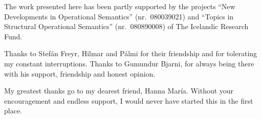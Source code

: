 The work presented here has been partly supported by the projects 
``New Developments in Operational Semantics'' (nr.~080039021) and
``Topics in Structural Operational Semantics'' (nr.~080890008) of 
The Icelandic Research Fund.

Thanks to Stef{\'a}n Freyr, Hilmar and P{\'a}lmi for their friendship and for
tolerating my constant interruptions. Thanks to Gu\dh{}mundur Bjarni, for always
being there with his support, friendship and honest opinion.

My greatest thanks go to my dearest friend, Hanna Mar{\'i}a. Without your encouragement
and endless support, I would never have started this in the first place.

